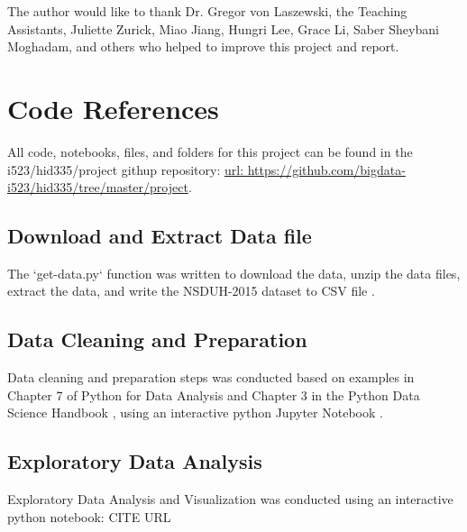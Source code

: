 \documentclass[sigconf]{acmart}
\begin{document}
\begin{acks}

The author would like to thank Dr. Gregor von Laszewski, the Teaching 
Assistants, Juliette Zurick, Miao Jiang, Hungri Lee, Grace Li, Saber Sheybani
Moghadam, and others who helped to improve this project and report.

\end{acks}


 


\appendix

\section{Code References}
All code, notebooks, files, and folders for this project can be found in the
i523/hid335/project githup repository: 
\url{url:  https://github.com/bigdata-i523/hid335/tree/master/project}.

\subsection{Download and Extract Data file}

The `get-data.py` function was written to download the data, unzip the data
files, extract the data, and write the NSDUH-2015 dataset to CSV file 
\cite{getdata17}.

\subsection{Data Cleaning and Preparation}

Data cleaning and preparation steps was conducted based on examples in 
Chapter 7 of Python for Data Analysis \cite{mckinney17} and Chapter 3 in 
the Python Data Science Handbook \cite{vanderplas17}, using an interactive 
python Jupyter Notebook \cite{data17}.

\subsection{Exploratory Data Analysis}

Exploratory Data Analysis and Visualization was conducted using an interactive
python notebook: CITE URL
\end{document}
